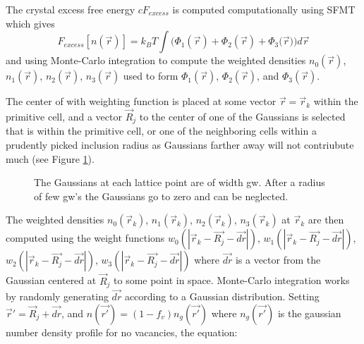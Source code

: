\documentclass[12pt]{article}
\begin{document}
The crystal excess free energy $cF_{excess}$ is computed computationally using SFMT which gives
\begin{displaymath}{F_{excess}[n(\vec{r})]= k_BT\int(\Phi_1(\vec{r})+\Phi_2(\vec{r})+\Phi_3(\vec{r}{)) d}\vec{r}}\end{displaymath} and using Monte-Carlo integration to compute the weighted densities $n_0(\vec{r})$, $n_1(\vec{r})$, $n_2(\vec{r})$, $n_3(\vec{r})$ used to form $\Phi_1(\vec{r})$, $\Phi_2(\vec{r})$, and $\Phi_3(\vec{r})$.

The center of with weighting function is placed at some vector $\vec{r}=\vec{r}_k$ within the primitive cell, and a vector $\vec{R}_j$ to the center of one of the Gaussians is selected that is within the primitive cell, or one of the neighboring cells within a prudently picked inclusion radius as Gaussians farther away will not contriubute much (see Figure \ref{fig:InclusionRadius}).

 \begin{figure}[h!]
    \centering
    \caption{The Gaussians at each lattice point are of width gw. After a radius of few gw's the Gaussians go to zero and can be neglected.}
    \label{fig:InclusionRadius}
  \end{figure} 



The weighted densities $n_0(\vec{r}_k)$, $n_1(\vec{r}_k)$, $n_2(\vec{r}_k)$, $n_3(\vec{r}_k)$ at $\vec{r}_k$ are then computed using the weight functions $w_0(|\vec{r}_k-\vec{R_j}-\vec{dr}|)$, $w_1(|\vec{r}_k-\vec{R_j}-\vec{dr}|)$, $w_2(|\vec{r}_k-\vec{R_j}-\vec{dr}|)$, $w_3(|\vec{r}_k-\vec{R_j}-\vec{dr}|)$ where $\vec{dr}$ is a vector from the Gaussian centered at $\vec{R}_j$ to some point in space. Monte-Carlo integration works by randomly generating $\vec{dr}$ according to a Gaussian distribution. Setting $\vec{r}'=\vec{R}_j + \vec{dr}$, and $n(\vec{r'})=(1-f_v)n_g(\vec{r'})$ where $n_g(\vec{r'})$ is the gaussian number density profile for no vacancies, the equation:
\end{document}
